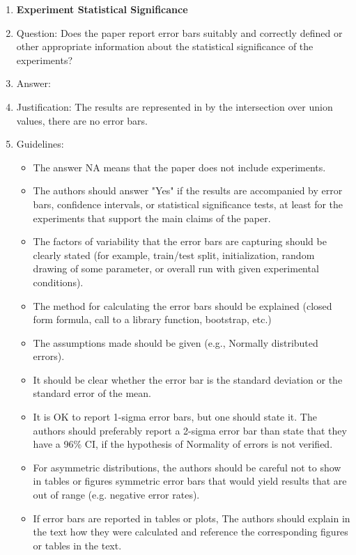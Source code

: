 \documentclass{article}
\begin{document}
\begin{enumerate}
\item {\bf Experiment Statistical Significance}
    \item[] Question: Does the paper report error bars suitably and correctly defined or other appropriate information about the statistical significance of the experiments?
    \item[] Answer: \answerNo{} %
    \item[] Justification: The results are represented in by the intersection over union values, there are no error bars.
    \item[] Guidelines:
    \begin{itemize}
        \item The answer NA means that the paper does not include experiments.
        \item The authors should answer "Yes" if the results are accompanied by error bars, confidence intervals, or statistical significance tests, at least for the experiments that support the main claims of the paper.
        \item The factors of variability that the error bars are capturing should be clearly stated (for example, train/test split, initialization, random drawing of some parameter, or overall run with given experimental conditions).
        \item The method for calculating the error bars should be explained (closed form formula, call to a library function, bootstrap, etc.)
        \item The assumptions made should be given (e.g., Normally distributed errors).
        \item It should be clear whether the error bar is the standard deviation or the standard error of the mean.
        \item It is OK to report 1-sigma error bars, but one should state it. The authors should preferably report a 2-sigma error bar than state that they have a 96\% CI, if the hypothesis of Normality of errors is not verified.
        \item For asymmetric distributions, the authors should be careful not to show in tables or figures symmetric error bars that would yield results that are out of range (e.g. negative error rates).
        \item If error bars are reported in tables or plots, The authors should explain in the text how they were calculated and reference the corresponding figures or tables in the text.
    \end{itemize}


\end{enumerate}
\end{document}
